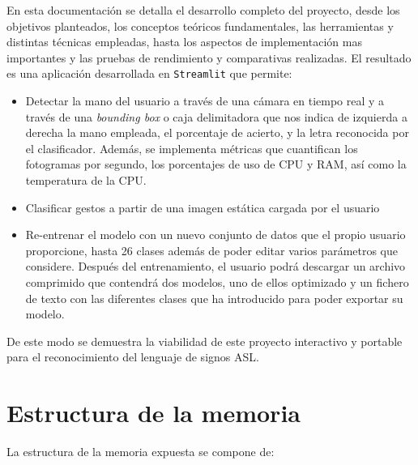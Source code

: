 En esta documentación se detalla el desarrollo completo del proyecto, desde los objetivos planteados, los conceptos teóricos fundamentales, las herramientas y distintas técnicas empleadas, hasta los aspectos de implementación mas importantes y las pruebas de rendimiento y comparativas realizadas. El resultado es una aplicación desarrollada en \texttt{Streamlit} que permite:
\begin{itemize}
\tightlist
    \item 
        Detectar la mano del usuario a través de una cámara en tiempo real y a través de una \textit{bounding box} o caja delimitadora que nos indica de izquierda a derecha la mano empleada, el porcentaje de acierto, y la letra reconocida por el clasificador. Además, se implementa métricas que cuantifican los fotogramas por segundo, los porcentajes de uso de CPU y RAM, así como la temperatura de la CPU.
    \item 
        Clasificar gestos a partir de una imagen estática cargada por el usuario
    \item 
        Re-entrenar el modelo con un nuevo conjunto de datos que el propio usuario proporcione, hasta 26 clases además de poder editar varios parámetros que considere. Después del entrenamiento, el usuario podrá descargar un archivo comprimido que contendrá dos modelos, uno de ellos optimizado y un fichero de texto con las diferentes clases que ha introducido para poder exportar su modelo.
\end{itemize}

De este modo se demuestra la viabilidad de este proyecto interactivo y portable para el reconocimiento del lenguaje de signos ASL.


\section{Estructura de la memoria}\label{estructura-de-la-memoria}
La estructura de la memoria expuesta se compone de:


